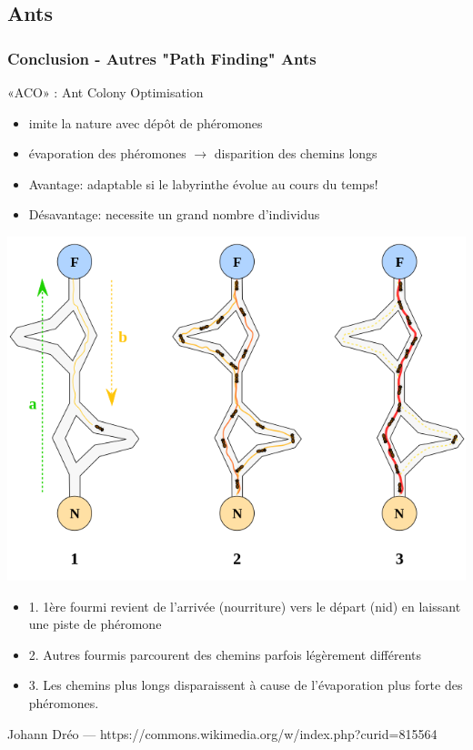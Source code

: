 \documentclass[]{beamer}
\begin{document}
\subsection{Ants}
\begin{frame}
  \frametitle{Conclusion - Autres "Path Finding" Ants}
  «ACO» : Ant Colony Optimisation
   \begin{itemize}
   \item imite la nature avec dépôt de phéromones
   \item évaporation des phéromones $\rightarrow$ disparition des chemins longs
   \item Avantage: adaptable si le labyrinthe évolue au cours du temps!
   \item Désavantage: necessite un grand nombre d'individus
   \end{itemize}
  \begin{minipage}{.45\linewidth}
   \includegraphics[width=\linewidth]{Aco_branches.svg.png}
  \end{minipage}
  \begin{minipage}{.5\linewidth}
   \begin{itemize}
	\item 1. 1ère fourmi revient de l'arrivée (nourriture) vers le départ (nid) en laissant une piste de phéromone
   \item 2. Autres fourmis parcourent des chemins parfois légèrement différents
   \item 3. Les chemins plus longs disparaissent à cause de l'évaporation plus forte des phéromones.
   \end{itemize}
  \end{minipage}
  Johann Dréo — https://commons.wikimedia.org/w/index.php?curid=815564
\end{frame}
\end{document}
